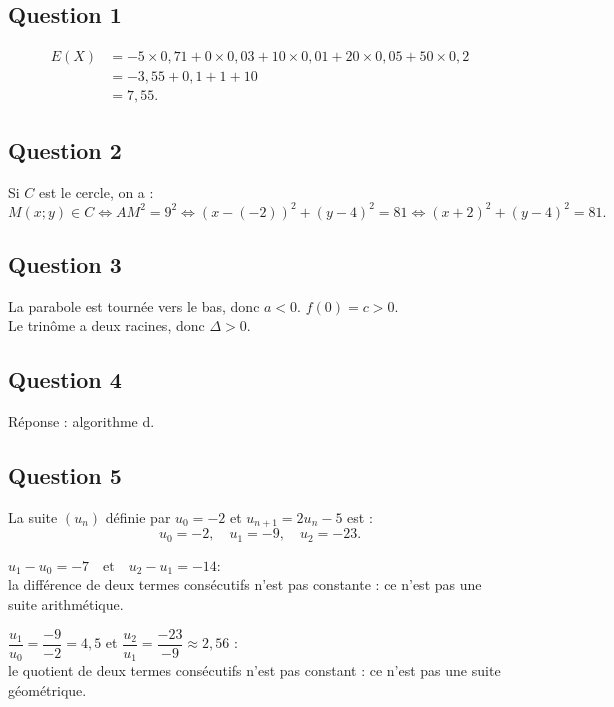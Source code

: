\subsection*{Question 1}
	
	\begin{align*}
E(X) &= -5 \times 0,71 + 0 \times 0,03 + 10 \times 0,01 + 20 \times 0,05 + 50 \times 0,2\\
& = -3,55 + 0,1 + 1 + 10\\
& = 7,55.
	\end{align*}
	
	\subsection*{Question 2}
	
	Si \(C\) est le cercle, on a :
	\[
	M(x ; y) \in C \Leftrightarrow AM^2 = 9^2 \Leftrightarrow (x - (-2))^2 + (y - 4)^2 = 81 \Leftrightarrow (x + 2)^2 + (y - 4)^2 = 81.
	\]
	
	\subsection*{Question 3}
	
	La parabole est tournée vers le bas, donc \(a < 0\). \(f(0) = c > 0\).\\
	 Le trinôme a deux racines, donc \(\Delta > 0\).
	
	\subsection*{Question 4}
	
	Réponse : algorithme d.
	
	\subsection*{Question 5}
	
	La suite \((u_n)\) définie par \(u_0 = -2\) et \(u_{n+1} = 2u_n - 5\) est :
	\[
	u_0 = -2, \quad u_1 = -9, \quad u_2 = -23.
	\]
	
$u_1 - u_0 = -7 \quad \text{et} \quad u_2 - u_1 = -14$:\\
la différence de deux termes consécutifs n'est pas constante : ce n'est pas une suite arithmétique.
	
	
$\dfrac{u_1}{u_0} = \dfrac{-9}{-2} = 4,5 $ et  $\dfrac{u_2}{u_1} = \dfrac{-23}{-9} \approx 2,56$ :\\  le quotient de deux termes consécutifs n'est pas constant : ce n'est pas une suite géométrique.
